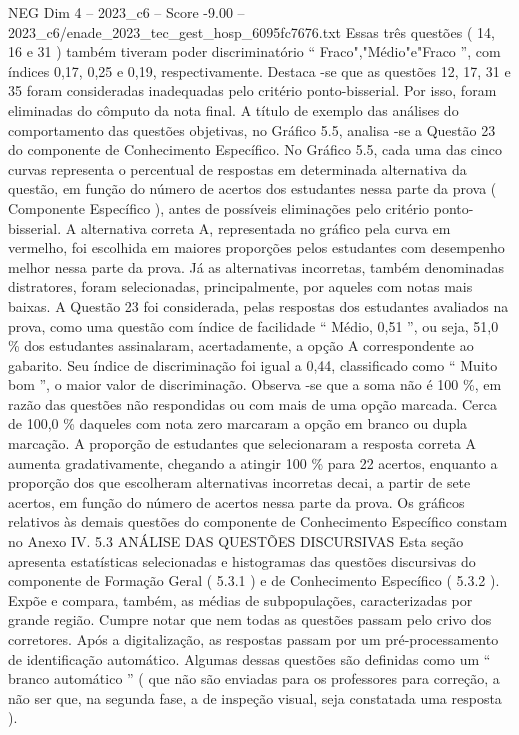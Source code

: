 \begin{textsample}{NEG Dim 4 – 2023\_c6 – Score -9.00 – 2023\_c6/enade\_2023\_tec\_gest\_hosp\_6095fc7676.txt}
Essas três questões ( 14, 16 e 31 ) também tiveram poder discriminatório “ Fraco","Médio"e"Fraco ”, com índices 0,17, 0,25 e 0,19, respectivamente.
Destaca -se que as questões 12, 17, 31 e 35 foram consideradas inadequadas pelo critério ponto-bisserial.
Por isso, foram eliminadas do cômputo da nota final.
A título de exemplo das análises do comportamento das questões objetivas, no Gráfico 5.5, analisa -se a Questão 23 do componente de Conhecimento Específico.
No Gráfico 5.5, cada uma das cinco curvas representa o percentual de respostas em determinada alternativa da questão, em função do número de acertos dos estudantes nessa parte da prova ( Componente Específico ), antes de possíveis eliminações pelo critério ponto-bisserial.
A alternativa correta A, representada no gráfico pela curva em vermelho, foi escolhida em maiores proporções pelos estudantes com desempenho melhor nessa parte da prova.
Já as alternativas incorretas, também denominadas distratores, foram selecionadas, principalmente, por aqueles com notas mais baixas.
A Questão 23 foi considerada, pelas respostas dos estudantes avaliados na prova, como uma questão com índice de facilidade “ Médio, 0,51 ”, ou seja, 51,0 \% dos estudantes assinalaram, acertadamente, a opção A correspondente ao gabarito.
Seu índice de discriminação foi igual a 0,44, classificado como “ Muito bom ”, o maior valor de discriminação.
Observa -se que a soma não é 100 \%, em razão das questões não respondidas ou com mais de uma opção marcada.
Cerca de 100,0 \% daqueles com nota zero marcaram a opção em branco ou dupla marcação.
A proporção de estudantes que selecionaram a resposta correta A aumenta gradativamente, chegando a atingir 100 \% para 22 acertos, enquanto a proporção dos que escolheram alternativas incorretas decai, a partir de sete acertos, em função do número de acertos nessa parte da prova.
Os gráficos relativos às demais questões do componente de Conhecimento Específico constam no Anexo IV. 5.3 ANÁLISE DAS QUESTÕES DISCURSIVAS Esta seção apresenta estatísticas selecionadas e histogramas das questões discursivas do componente de Formação Geral ( 5.3.1 ) e de Conhecimento Específico ( 5.3.2 ).
Expõe e compara, também, as médias de subpopulações, caracterizadas por grande região.
Cumpre notar que nem todas as questões passam pelo crivo dos corretores.
Após a digitalização, as respostas passam por um pré-processamento de identificação automático.
Algumas dessas questões são definidas como um “ branco automático ” ( que não são enviadas para os professores para correção, a não ser que, na segunda fase, a de inspeção visual, seja constatada uma resposta ).

\end{textsample}
